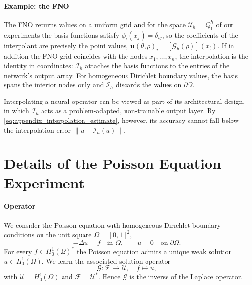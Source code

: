 \documentclass{article} %
\begin{document}
\paragraph{Example: the FNO} The FNO returns values on a uniform grid and for the space $\mathcal U_h = Q_1^h$ of our experiments the basis functions satisfy $\phi_i(x_j) = \delta_{ij}$, so the coefficients of the interpolant are precisely the point values, $\mathbf u(\theta,\rho)_i = [\mathcal G_\theta(\rho)](x_i)$. If in addition the FNO grid coincides with the nodes $x_1,\dots,x_n$, the interpolation is the identity in coordinates: $\mathcal I_h$ attaches the basis functions to the entries of the network's output array. For homogeneous Dirichlet boundary values, the basis spans the interior nodes only and $\mathcal I_h$ discards the values on $\partial\Omega$.


Interpolating a neural operator can be viewed as part of its architectural design, in which $\mathcal I_h$ acts as a problem-adapted, non-trainable output layer. By \eqref{eq:appendix_interpolation_estimate}, however, its accuracy cannot fall below the interpolation error $\| u - \mathcal I_h(u) \|$.

\section{Details of the Poisson Equation Experiment}\label{appendix:details_poisson}

\paragraph{Operator} We consider the Poisson equation with homogeneous Dirichlet boundary conditions on the unit square $\Omega = [0,1]^2$,
\begin{equation}\label{eq:appendix_poisson}
   -\Delta u = f \quad \text{in } \Omega, \qquad u = 0 \quad \text{on } \partial\Omega.
\end{equation}
For every $f\in H^{1}_0(\Omega)^*$ the Poisson equation admits a unique weak solution $u\in H^1_0(\Omega)$. We learn the associated solution operator 
\begin{equation*}
   \mathcal G: \mathcal F \to \mathcal U, \quad f \mapsto u,
\end{equation*}
with $\mathcal U = H^1_0(\Omega)$ and $\mathcal F=\mathcal U^*$. Hence $\mathcal G$ is the inverse of the Laplace operator.
\end{document}
